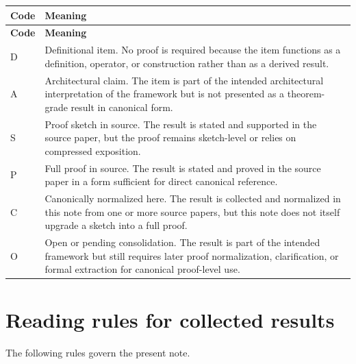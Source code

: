 \documentclass[12pt]{article}
\begin{document}
	\begin{longtable}{>{\RaggedRight\arraybackslash}p{}
			>{\RaggedRight\arraybackslash}p{}}
		\toprule
		\textbf{Code} & \textbf{Meaning} \\
		\midrule
		\endfirsthead
		\toprule
		\textbf{Code} & \textbf{Meaning} \\
		\midrule
		\endhead
		
		D & Definitional item. No proof is required because the item functions as a definition, operator, or construction rather than as a derived result. \\
		
		A & Architectural claim. The item is part of the intended architectural interpretation of the framework but is not presented as a theorem-grade result in canonical form. \\
		
		S & Proof sketch in source. The result is stated and supported in the source paper, but the proof remains sketch-level or relies on compressed exposition. \\
		
		P & Full proof in source. The result is stated and proved in the source paper in a form sufficient for direct canonical reference. \\
		
		C & Canonically normalized here. The result is collected and normalized in this note from one or more source papers, but this note does not itself upgrade a sketch into a full proof. \\
		
		O & Open or pending consolidation. The result is part of the intended framework but still requires later proof normalization, clarification, or formal extraction for canonical proof-level use. \\
		
		\bottomrule
	\end{longtable}
	
	\section{Reading rules for collected results}
	
	The following rules govern the present note.
	
\end{document}
